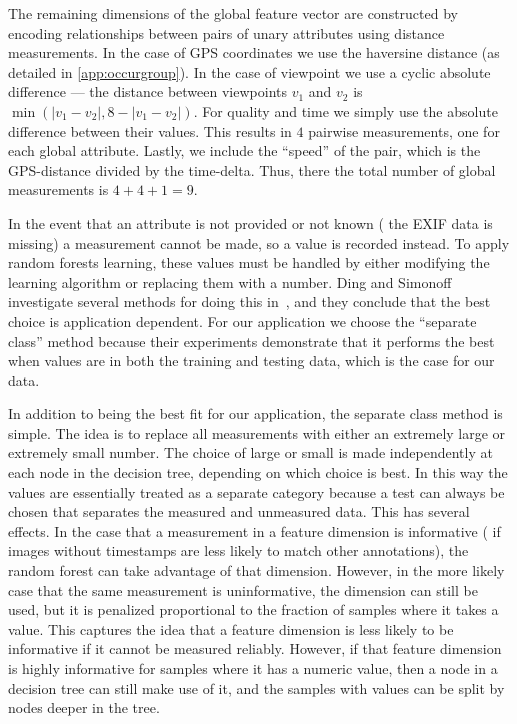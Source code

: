 The remaining dimensions of the global feature vector are constructed by encoding relationships between pairs of
  unary attributes using distance measurements.
In the case of GPS coordinates we use the haversine distance (as detailed in \cref{app:occurgroup}).
In the case of viewpoint we use a cyclic absolute difference --- \ie{} the distance between viewpoints $v_1$ and
  $v_2$ is $\min(|v_1 - v_2|, 8 - |v_1 - v_2|)$.
For quality and time we simply use the absolute difference between their values.
This results in $4$ pairwise measurements, one for each global attribute.
Lastly, we include the ``speed'' of the pair, which is the GPS-distance divided by the time-delta.
Thus, there the total number of global measurements is $4 + 4 + 1 = 9$.

In the event that an attribute is not provided or not known (\eg{} the EXIF data is missing) a measurement cannot
  be made, so a \nan{} value is recorded instead.
To apply random forests learning, these \nan{} values must be handled by either modifying the learning algorithm
  or replacing them with a number.
Ding and Simonoff investigate several methods for doing this in~\cite{ding_investigation_2010}, and they conclude
  that the best choice is application dependent.
For our application we choose the ``separate class'' method because their experiments demonstrate that it
  performs the best when \nan{} values are in both the training and testing data, which is the case for our data.

In addition to being the best fit for our application, the separate class method is simple.
The idea is to replace all \nan{} measurements with either an extremely large or extremely small number.
The choice of large or small is made independently at each node in the decision tree, depending on which choice
  is best.
In this way the \nan{} values are essentially treated as a separate category because a test can always be chosen
  that separates the measured and unmeasured data.
This has several effects.
In the case that a \nan{} measurement in a feature dimension is informative (\eg{} if images without timestamps
  are less likely to match other annotations), the random forest can take advantage of that dimension.
However, in the more likely case that the same \nan{} measurement is uninformative, the dimension can still be
  used, but it is penalized proportional to the fraction of samples where it takes a \nan{} value.
This captures the idea that a feature dimension is less likely to be informative if it cannot be measured
  reliably.
However, if that feature dimension is highly informative for samples where it has a numeric value, then a node in
  a decision tree can still make use of it, and the samples with \nan{} values can be split by nodes deeper in the
  tree.

